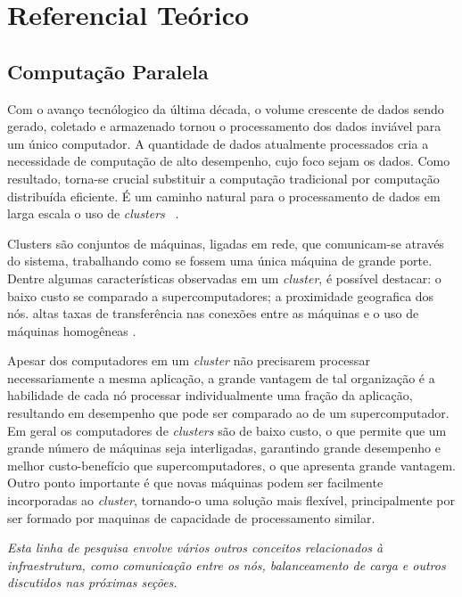 \chapter{Referencial Teórico}
\label{cap:referencial}

 
\section{ Computação Paralela}


Com o avanço tecnólogico da última década, o volume crescente de dados sendo gerado, coletado e armazenado tornou o processamento dos dados inviável para um único computador. A quantidade de dados atualmente processados cria a necessidade de computação de alto desempenho, cujo foco sejam os dados.  Como resultado, torna-se crucial substituir a computação tradicional por computação distribuída eficiente. 
É um caminho natural para o processamento de dados em larga escala o uso de \textit{clusters} ~\cite{Lin:2010}.

Clusters são conjuntos de máquinas, ligadas em rede, que comunicam-se através do sistema, trabalhando como se fossem uma única máquina de grande porte. 
Dentre algumas características observadas em um \textit{cluster}, é possível destacar: o baixo custo se comparado a supercomputadores; a proximidade geografica dos nós. altas taxas de transferência nas conexões entre as máquinas e o uso de máquinas homogêneas \cite{Toth:2008}.

Apesar dos computadores em um \textit{cluster} não precisarem processar necessariamente a mesma aplicação, a grande vantagem de tal organização é a habilidade de cada nó processar individualmente uma fração da aplicação, resultando em desempenho que pode ser comparado ao de um supercomputador.
Em geral os computadores de \textit{clusters} são de baixo custo, o que permite que um grande número de máquinas seja interligadas, garantindo grande desempenho e melhor custo-benefício que supercomputadores, o que apresenta grande vantagem. Outro ponto importante é que novas máquinas podem ser facilmente incorporadas  ao \textit{cluster}, tornando-o uma solução mais flexível, principalmente por ser formado por maquinas de capacidade de processamento similar.

\textit{Esta linha de pesquisa envolve vários outros conceitos relacionados à infraestrutura, como comunicação entre os nós, balanceamento de carga e outros discutidos nas próximas seções.}



